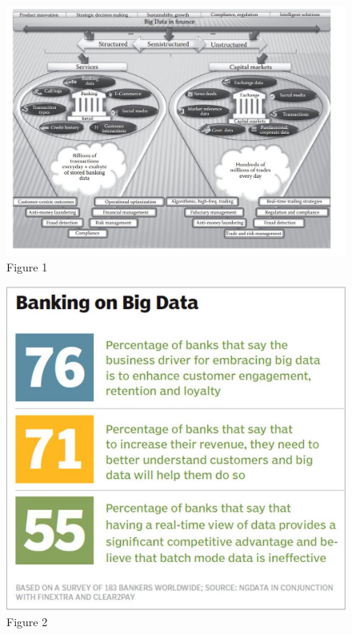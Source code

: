 \documentclass[sigconf]{acmart}
\begin{document}
\begin{figure}[p!]
    \includegraphics{images/dataTypes.JPG}
    \caption{Figure 1}
    \label{fig:figure1}
\end{figure}

\begin{figure}[p!]
    \includegraphics{images/bankingBigData.JPG}
    \caption{Figure 2}
    \label{fig:figure2}
\end{figure}


 


\end{document}
